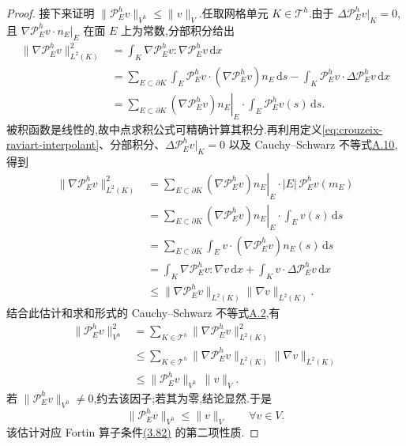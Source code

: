 \begin{proof}
接下来证明 $\|\mathcal{P}_E^h v\|_{V^h}\le\|v\|_V$.任取网格单元 $K\in\mathcal{T}^h$.由于 $\Delta\mathcal{P}_E^h v|_K=0$,且 $\nabla\mathcal{P}_E^h v\cdot n_E|_E$ 在面 $E$ 上为常数,分部积分给出
\[
\begin{aligned}
  \|\nabla\mathcal{P}_E^h v\|_{L^2(K)}^2
   &=\int_K\nabla\mathcal{P}_E^h v:
             \nabla\mathcal{P}_E^h v\,\mathrm{d}x\\
   &=\sum_{E\subset\partial K}
       \int_E\mathcal{P}_E^h v\cdot
          (\nabla\mathcal{P}_E^h v)n_E\,\mathrm{d}s
       -\int_K\mathcal{P}_E^h v\cdot
          \Delta\mathcal{P}_E^h v\,\mathrm{d}x\\
   &=\sum_{E\subset\partial K}
       \left.(\nabla\mathcal{P}_E^h v)n_E\right|_E
          \cdot\int_E\mathcal{P}_E^h v(s)\,\mathrm{d}s.
\end{aligned}
\]
被积函数是线性的,故中点求积公式可精确计算其积分.再利用定义\cref{eq:crouzeix-raviart-interpolant}、分部积分、$\Delta\mathcal{P}_E^h v|_K=0$ 以及 Cauchy--Schwarz 不等式\hyperref[eq:appendix-a-10]{A.10},得到
\[
\begin{aligned}
  \|\nabla\mathcal{P}_E^h v\|_{L^2(K)}^2
   &=\sum_{E\subset\partial K}
       \left.(\nabla\mathcal{P}_E^h v)n_E\right|_E
       \cdot |E|\,\mathcal{P}_E^h v(m_E)\\
   &=\sum_{E\subset\partial K}
       \left.(\nabla\mathcal{P}_E^h v)n_E\right|_E
       \cdot\int_E v(s)\,\mathrm{d}s\\
   &=\sum_{E\subset\partial K}
       \int_E v\cdot(\nabla\mathcal{P}_E^h v)n_E(s)\,\mathrm{d}s\\
   &=\int_K\nabla\mathcal{P}_E^h v:\nabla v\,\mathrm{d}x
       +\int_K v\cdot\Delta\mathcal{P}_E^h v\,\mathrm{d}x\\
   &\le \|\nabla\mathcal{P}_E^h v\|_{L^2(K)}
         \|\nabla v\|_{L^2(K)}.
\end{aligned}
\]
结合此估计和求和形式的 Cauchy--Schwarz 不等式\hyperref[eq:appendix-a-2]{A.2},有
\[
\begin{aligned}
  \|\mathcal{P}_E^h v\|_{V^h}^2
   &=\sum_{K\in\mathcal{T}^h}
       \|\nabla\mathcal{P}_E^h v\|_{L^2(K)}^2\\
   &\le\sum_{K\in\mathcal{T}^h}
       \|\nabla\mathcal{P}_E^h v\|_{L^2(K)}
       \|\nabla v\|_{L^2(K)}\\
   &\le\|\mathcal{P}_E^h v\|_{V^h}\,\|v\|_V.
\end{aligned}
\]
若 $\|\mathcal{P}_E^h v\|_{V^h}\ne0$,约去该因子;若其为零,结论显然.于是
\begin{equation}\label{eq:crouzeix-raviart-fortin-bound}
  \|\mathcal{P}_E^h v\|_{V^h}\le\|v\|_V
  \qquad\forall v\in V.
\end{equation}
该估计对应 Fortin 算子条件\hyperref[eq:fortin-property]{(3.82)} 的第二项性质.


\end{proof}
